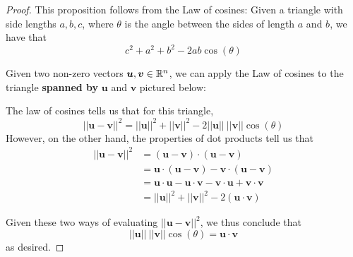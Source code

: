 \begin{proof}

This proposition follows from the Law of cosines:  Given a triangle with side lengths $a, b, c$, where $\theta$ is the angle between the sides of length $a$ and $b$, we have that $$c^2 + a^2 + b^2 - 2ab\cos(\theta)$$

Given two non-zero vectors $\bm{u}, \bm{v} \in \mathbb{R}^n$, we can apply the Law of cosines to the triangle \textbf{spanned by} $\bm{u}$ and $\bm{v}$ pictured below:


\begin{center}
        \end{center}

The law of cosines tells us that for this triangle, $$||\bm{u-v}||^2 = ||\bm{u}||^2+||\bm{v}||^2 -2||\bm{u}||\ ||\bm{v}||\cos(\theta)$$
However, on the other hand, the properties of dot products tell us that
\begin{align*}
    ||\bm{u-v}||^2 &= (\bm{u-v}) \cdot (\bm{u-v}) \\
    &= \bm{u} \cdot (\bm{u-v}) - \bm{v} \cdot (\bm{u-v}) \\
    &= \bm{u} \cdot \bm{u} - \bm{u} \cdot \bm{v} - \bm{v} \cdot \bm{u} + \bm{v} \cdot \bm{v}  \\
    &= ||\bm{u}||^2+||\bm{v}||^2 -2(\bm{u} \cdot \bm{v})
\end{align*}

Given these two ways of evaluating $||\bm{u-v}||^2$, we thus conclude that $$||\bm{u}||\ ||\bm{v}||\cos(\theta) = \bm{u} \cdot \bm{v}$$ as desired.

\end{proof}


